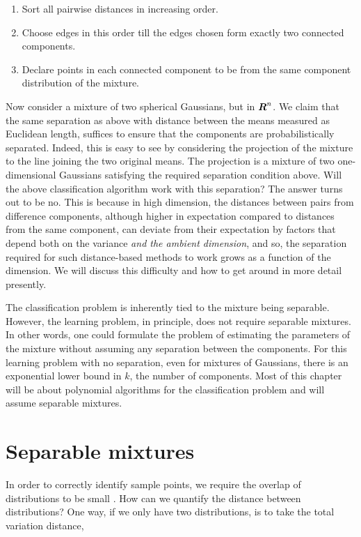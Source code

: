 \documentclass{book}
\numberwithin{exercise}{chapter}
\begin{document}
\begin{enumerate}
\item Sort all pairwise distances in increasing order.
\item Choose edges in this order till the edges chosen form exactly two connected components.
\item Declare points in each connected component to be from the same component distribution of the mixture.
\end{enumerate}

Now consider a mixture of two spherical Gaussians, but in $\mbox{\mbox{\boldmath $R$}}^n$. We claim that the same separation as above with
distance between the means measured as Euclidean length, suffices to ensure that the components are probabilistically
separated. Indeed, this is easy to see by considering the projection of the mixture to the line joining the two original means.
The projection is a mixture of two one-dimensional Gaussians satisfying the required separation condition above. Will the above
classification algorithm work with this separation? The answer turns out to be no. This is because in high dimension,
the distances between pairs from difference components, although higher in expectation compared to distances from the same
component, can deviate from their expectation by factors that depend both on the variance {\em and the ambient dimension},
and so, the separation required for such distance-based methods to work grows as a function of the dimension. We will discuss
this difficulty and how to get around in more detail presently.

The classification problem is inherently tied to the mixture being separable. However, the learning problem,
in principle, does not require separable mixtures.
In other words, one could formulate the problem of estimating the parameters of the
mixture without assuming any separation between the components. For this learning problem with no separation, even for mixtures of Gaussians, there is an exponential
lower bound in $k$, the number of components. Most of this chapter will be about polynomial algorithms for
the classification problem and will assume separable mixtures.

\section{Separable mixtures}

In order to correctly identify sample points, we require the overlap of
distributions to be small .  How can we quantify the distance between
distributions?  One way, if we only have two distributions, is to take the
total variation distance,
\end{document}
